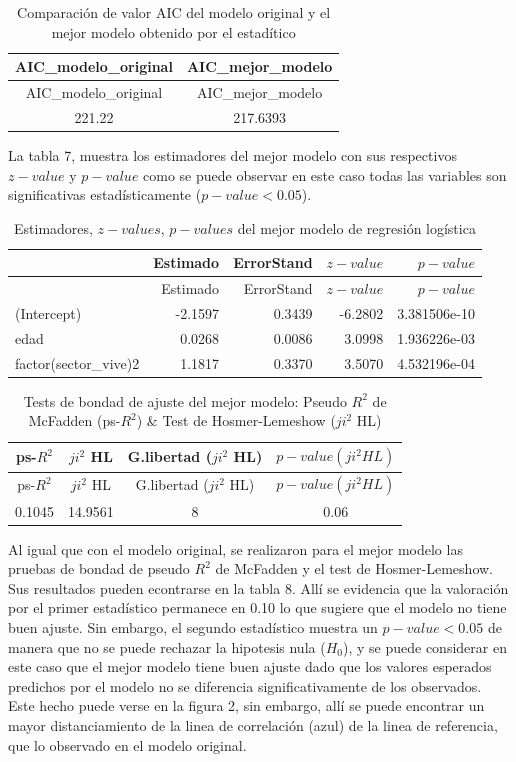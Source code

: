 \documentclass[
]{article}
\begin{document}
\begin{longtable}[]{@{}cc@{}}
\caption{Comparación de valor AIC del modelo original y el mejor modelo
obtenido por el estadítico}\tabularnewline
\toprule
AIC\_modelo\_original & AIC\_mejor\_modelo\tabularnewline
\midrule
\endfirsthead
\toprule
AIC\_modelo\_original & AIC\_mejor\_modelo\tabularnewline
\midrule
\endhead
221.22 & 217.6393\tabularnewline
\bottomrule
\end{longtable}

La tabla 7, muestra los estimadores del mejor modelo con sus respectivos
\(z-value\) y \(p-value\) como se puede observar en este caso todas las
variables son significativas estadísticamente (\(p-value < 0.05\)).

\begin{longtable}[]{@{}lrrrr@{}}
\caption{Estimadores, \(z-values\), \(p-values\) del mejor modelo de
regresión logística}\tabularnewline
\toprule
& Estimado & ErrorStand & \(z-value\) & \(p-value\)\tabularnewline
\midrule
\endfirsthead
\toprule
& Estimado & ErrorStand & \(z-value\) & \(p-value\)\tabularnewline
\midrule
\endhead
(Intercept) & -2.1597 & 0.3439 & -6.2802 & 3.381506e-10\tabularnewline
edad & 0.0268 & 0.0086 & 3.0998 & 1.936226e-03\tabularnewline
factor(sector\_vive)2 & 1.1817 & 0.3370 & 3.5070 &
4.532196e-04\tabularnewline
\bottomrule
\end{longtable}

\begin{longtable}[]{@{}cccc@{}}
\caption{Tests de bondad de ajuste del mejor modelo: Pseudo \(R^2\) de
McFadden (ps-\(R^2\)) \& Test de Hosmer-Lemeshow (\(ji^2\)
HL)}\tabularnewline
\toprule
ps-\(R^2\) & \(ji^2\) HL & G.libertad (\(ji^2\) HL) &
\(p-value(ji^2 HL)\)\tabularnewline
\midrule
\endfirsthead
\toprule
ps-\(R^2\) & \(ji^2\) HL & G.libertad (\(ji^2\) HL) &
\(p-value(ji^2 HL)\)\tabularnewline
\midrule
\endhead
0.1045 & 14.9561 & 8 & 0.06\tabularnewline
\bottomrule
\end{longtable}

Al igual que con el modelo original, se realizaron para el mejor modelo
las pruebas de bondad de pseudo \(R^2\) de McFadden y el test de
Hosmer-Lemeshow. Sus resultados pueden econtrarse en la tabla 8. Allí se
evidencia que la valoración por el primer estadístico permanece en 0.10
lo que sugiere que el modelo no tiene buen ajuste. Sin embargo, el
segundo estadístico muestra un \(p-value < 0.05\) de manera que no se
puede rechazar la hipotesis nula (\(H_0\)), y se puede considerar en
este caso que el mejor modelo tiene buen ajuste dado que los valores
esperados predichos por el modelo no se diferencia significativamente de
los observados. Este hecho puede verse en la figura 2, sin embargo, allí
se puede encontrar un mayor distanciamiento de la linea de correlación
(azul) de la linea de referencia, que lo observado en el modelo
original.
\end{document}
